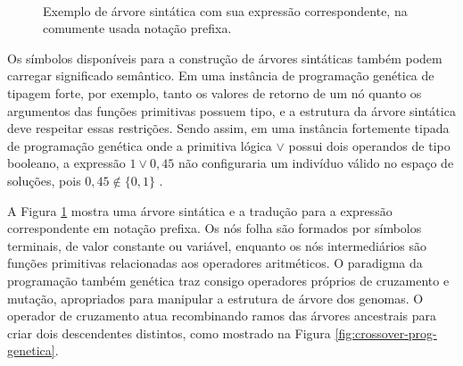 \documentclass[
	12pt,				%
	openright,			%
	twoside,			%
	a4paper,			%
	tcc,			%
	]{ABNT-DC-UEL}
\begin{document}
\begin{figure}[htb]
    \centering
    \\ \vspace{0.2cm} 
    \caption{Exemplo de árvore sintática com sua expressão correspondente, na comumente usada notação prefixa.}
    \label{fig:prog-genetica}
\end{figure}

Os símbolos disponíveis para a construção de árvores sintáticas também podem carregar significado semântico. Em uma instância de programação genética de tipagem forte, por exemplo, tanto os valores de retorno de um nó quanto os argumentos das funções primitivas possuem tipo, e a estrutura da árvore sintática deve respeitar essas restrições. Sendo assim, em uma instância fortemente tipada de programação genética onde a primitiva lógica $\lor$ possui dois operandos de tipo booleano, a expressão $1 \lor 0,45$ não configuraria um indivíduo válido no espaço de soluções, pois $0,45 \notin \{0,1\}$ \cite{eiben:15}.

A Figura \ref{fig:prog-genetica} mostra uma árvore sintática e a tradução para a expressão correspondente em notação prefixa. Os nós folha são formados por símbolos terminais, de valor constante ou variável, enquanto os nós intermediários são funções primitivas relacionadas aos operadores aritméticos. O paradigma da programação também genética traz consigo operadores próprios de cruzamento e mutação, apropriados para manipular a estrutura de árvore dos genomas. O operador de cruzamento atua recombinando ramos das árvores ancestrais para criar dois descendentes distintos, como mostrado na Figura \ref{fig:crossover-prog-genetica}. 
\end{document}
